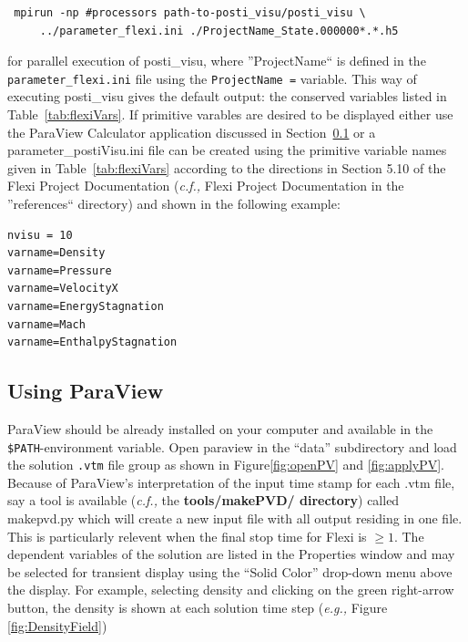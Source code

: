 \begin{appendices}
\begin{verbatim}
 mpirun -np #processors path-to-posti_visu/posti_visu \
     ../parameter_flexi.ini ./ProjectName_State.000000*.*.h5
\end{verbatim}
\noindent for parallel execution of posti\_visu, where ''ProjectName``  is defined in the \verb|parameter_flexi.ini| file using the \verb|ProjectName =| variable.  This way of executing posti\_visu gives the default output: the conserved variables listed in Table~\ref{tab:flexiVars}.  If primitive varables are desired to be displayed either use the ParaView Calculator application discussed in Section~\ref{sec:usingParaView} or a parameter\_postiVisu.ini file can be created using the primitive variable names given in Table~\ref{tab:flexiVars} according to the directions in Section 5.10 of the Flexi Project Documentation (\textit{c.f.,} Flexi Project Documentation in the ''references`` directory) and shown in the following example:

\begin{verbatim}
nvisu = 10
varname=Density
varname=Pressure
varname=VelocityX
varname=EnergyStagnation
varname=Mach
varname=EnthalpyStagnation
\end{verbatim}

\subsection{Using ParaView}\label{sec:usingParaView}

ParaView should be already installed on your computer and available in the \verb|$PATH|-environment variable. Open paraview in the ``data'' subdirectory and load the solution \verb|.vtm| file group as shown in Figure\ref{fig:openPV} and \ref{fig:applyPV}. Because of ParaView's interpretation of the input time stamp for each .vtm file, say a tool is available (\textit{c.f.,} the \textbf{tools/makePVD/ directory}) called makepvd.py which will create a new input file with all output residing in one file.  This is particularly relevent when the final stop time for Flexi is $\ge 1.$ The dependent variables of the solution are listed in the Properties window and may be selected for transient display using the ``Solid Color'' drop-down menu above the display.  For example, selecting density and clicking on the green right-arrow button, the density is shown at each solution time step (\textit{e.g.,} Figure \ref{fig:DensityField})


\end{appendices}
